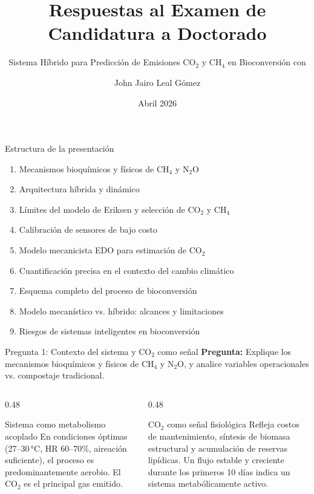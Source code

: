 \documentclass[aspectratio=169, 11pt]{beamer}
\title[Respuestas Examen]{Respuestas al Examen de Candidatura a Doctorado}
\subtitle{Sistema Híbrido para Predicción de Emisiones CO$_2$ y CH$_4$ en Bioconversión con \BSF}
\author{John Jairo Leal Gómez}
\institute[UNAL]{Doctorado en Estudios Ambientales\\Universidad Nacional de Colombia -- Sede Palmira}
\date{Abril 2026}
\newcommand{\NDIR}{\text{NDIR}}
\newcommand{\MRV}{\text{MRV}}
\begin{document}
\begin{frame}[plain]
\titlepage
\end{frame}

\begin{frame}{Estructura de la presentación}
\small
\begin{enumerate}
    \item Mecanismos bioquímicos y físicos de CH$_4$ y N$_2$O
    \item Arquitectura híbrida y \MRV{} dinámico
    \item Límites del modelo de Eriksen y selección de CO$_2$ y CH$_4$
    \item Calibración de sensores \NDIR{} de bajo costo
    \item Modelo mecanicista EDO para estimación de CO$_2$
    \item Cuantificación precisa en el contexto del cambio climático
    \item Esquema completo del proceso de bioconversión
    \item Modelo mecanístico vs. híbrido: alcances y limitaciones
    \item Riesgos de sistemas inteligentes en bioconversión
\end{enumerate}
\end{frame}

\begin{frame}{Pregunta 1: Contexto del sistema y CO$_2$ como señal}
\textbf{Pregunta:} Explique los mecanismos bioquímicos y físicos de CH$_4$ y N$_2$O, y analice variables operacionales vs. compostaje tradicional.

\vspace{0.3cm}
\begin{columns}[T]
\begin{column}{0.48\textwidth}
\begin{block}{Sistema como metabolismo acoplado}
\footnotesize
En condiciones óptimas (27--30\,°C, HR 60--70\%, aireación suficiente), el proceso es predominantemente aerobio. El CO$_2$ es el principal gas emitido.
\end{block}
\end{column}
\begin{column}{0.48\textwidth}
\begin{exampleblock}{CO$_2$ como señal fisiológica}
\footnotesize
Refleja costos de mantenimiento, síntesis de biomasa estructural y acumulación de reservas lipídicas. Un flujo estable y creciente durante los primeros 10 días indica un sistema metabólicamente activo.
\end{exampleblock}
\end{column}
\end{columns}
\end{frame}
\end{document}
